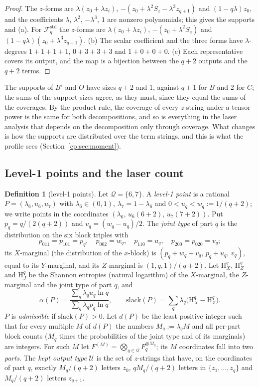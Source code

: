 \documentclass[11pt]{article}
\theoremstyle{definition}
\newtheorem{definition}[theorem]{Definition}
\theoremstyle{remark}
\newcommand{\Ent}{\mathrm{H}}                 %
\newcommand{\Qs}{\mathcal{Q}}                 %
\newcommand{\slack}{\mathrm{slack}}           %
\newcommand{\Ukept}{\mathcal{U}}              %
\newcommand{\Fstd}{\mathcal{F}^{\mathrm{std}}_q} %
\newcommand{\Bp}{B'}                          %
\newcommand{\Oterm}{O}                        %
\begin{document}
\begin{proof}
The $z$-forms are $\lambda(z_0+\lambda z_i)$, $-(z_0+\lambda^2S_z-\lambda^3z_{q+1})$ and $(1-q\lambda)z_0$, and the coefficients $\lambda$, $\lambda^2$, $-\lambda^3$, $1$ are nonzero polynomials; this gives the supports and (a). For $\Fstd$ the $z$-forms are $\lambda(z_0+\lambda z_i)$, $-(z_0+\lambda^2S_z)$ and $(1-q\lambda)(z_0+\lambda^3z_{q+1})$. (b) The scalar coefficient and the three forms have $\lambda$-degrees $1+1+1+1$, $0+3+3+3$ and $1+0+0+0$. (c) Each representative covers its output, and the map is a bijection between the $q+2$ outputs and the $q+2$ terms.
\end{proof}

The supports of $\Bp$ and $\Oterm$ have sizes $q+2$ and $1$, against $q+1$ for $B$ and $2$ for $C$; the sums of the support sizes agree, as they must, since they equal the sums of the coverages. By the product rule, the coverage of every $z$-string under a tensor power is the same for both decompositions, and so is everything in the laser analysis that depends on the decomposition only through coverage. What changes is how the supports are distributed over the term strings, and this is what the profile sees (Section~\ref{cp:sec:moment}).

\subsection{Level-1 points and the laser count}\label{cp:sec:laser1}

\begin{definition}[level-1 points]\label{cp:L3}
Let $\Qs=\{6,7\}$. A \emph{level-1 point} is a rational $P=(\lambda_6,u_6,u_7)$ with $\lambda_6\in(0,1)$, $\lambda_7=1-\lambda_6$ and $0<u_q<w_q:=1/(q+2)$; we write points in the coordinates $(\lambda_6,\,u_6(6+2),\,u_7(7+2))$. Put $p_q=q/(2(q+2))$ and $v_q=(w_q-u_q)/2$. The \emph{joint type} of part $q$ is the distribution on the six block triples with
\[
p_{011}=p_{101}=p_q,\quad p_{002}=w_q,\quad p_{110}=u_q,\quad p_{200}=p_{020}=v_q;
\]
its $X$-marginal (the distribution of the $x$-block) is $(p_q+w_q+v_q,\,p_q+u_q,\,v_q)$, equal to its $Y$-marginal, and its $Z$-marginal is $(1,q,1)/(q+2)$. Let $\Ent^q_X$, $\Ent^q_Z$ and $\Ent^q_J$ be the Shannon entropies (natural logarithm) of the $X$-marginal, the $Z$-marginal and the joint type of part $q$, and
\[
\alpha(P)=\frac{\sum_q\lambda_qu_q\ln q}{\sum_q\lambda_qp_q\ln q},\qquad\slack(P)=\sum_q\lambda_q\bigl(\Ent^q_X-\Ent^q_Z\bigr).
\]
$P$ is \emph{admissible} if $\slack(P)>0$. Let $d(P)$ be the least positive integer such that for every multiple $M$ of $d(P)$ the numbers $M_q:=\lambda_qM$ and all per-part block counts ($M_q$ times the probabilities of the joint type and of its marginals) are integers. For such $M$ let $F^{(M)}=\bigotimes_{q\in\Qs}F_q^{\otimes M_q}$; its $M$ coordinates fall into two \emph{parts}. The \emph{kept output type} $\Ukept$ is the set of $z$-strings that have, on the coordinates of part $q$, exactly $M_q/(q+2)$ letters $z_0$, $qM_q/(q+2)$ letters in $\{z_1,\dots,z_q\}$ and $M_q/(q+2)$ letters $z_{q+1}$.
\end{definition}
\end{document}
